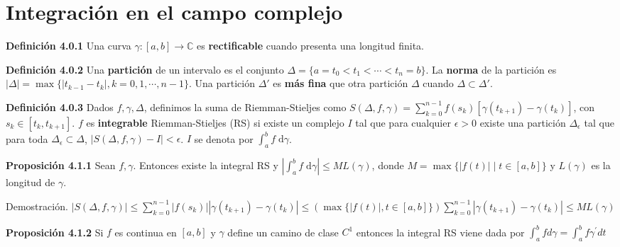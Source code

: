 \documentclass[a4paper, 11pt]{extarticle}
\newcommand{\propo}[1]{\textcolor{rojo}{\textbf{Proposición #1}}}
\newcommand{\defi}[1]{\textcolor{azul}{\textbf{Definición #1}}}
\newcommand{\dem}[1]{\textcolor{gris}{\small{Demostración. #1}}}
\begin{document}
\section*{Integración en el campo complejo}
\label{sec:org33f3f60}
\begin{multicols*}{2}


\defi{4.0.1} Una curva \(\gamma:[a,b] \rightarrow  \mathbb{C}\) es
\textbf{rectificable} cuando presenta una longitud finita.

\defi{4.0.2} Una \textbf{partición} de un intervalo es el conjunto \(\Delta = \{ a =
t_0 < t_1 < \cdots < t_n = b \}\). La \textbf{norma} de la partición es \(|\Delta| =
\max \{ |t_{k-1} - t_k|, k = 0, 1, \cdots, n-1 \}\). Una partición \(\Delta'\) es \textbf{más fina} que otra partición \(\Delta\) cuando \(\Delta \subset \Delta'\).

\defi{4.0.3} Dados \(f, \gamma, \Delta\), definimos la suma de
Riemman-Stieljes como \(S(\Delta, f, \gamma) = \sum_{k=0}^{n-1}
f(s_k)[\gamma(t_{k+1}) - \gamma(t_{k})]\), con \(s_k \in [t_k, t_{k+1}]\).
\(f\) es \textbf{integrable} Riemman-Stieljes (RS) si existe un complejo \(I\) tal que 
para cualquier \(\epsilon > 0\)
existe una partición \(\Delta_{\epsilon}\) tal que para toda \(\Delta_{\epsilon} \subset \Delta\), \(|S(\Delta, f, \gamma) - I| < \epsilon\). \(I\) se denota por \(\int_ { a }^{ b } f \; \text{d}\gamma\).

\propo{4.1.1} Sean \(f, \gamma\). Entonces existe la integral RS y 
\(\left|\int_ { a }^{ b } f \; \text{d}\gamma  \right| \le ML(\gamma)\), 
donde \(M = \max \{ |f(t)|\;|\;t \in [a,b] \}\) y \(L(\gamma)\) es la
longitud de \(\gamma\).

\dem{ \( |S(\Delta, f, \gamma)|  \leq \sum_{k=0}^{n-1}\left|f\left(s_{k}\right)\right|\left|\gamma\left(t_{k+1}\right)-\gamma\left(t_{k}\right)\right| 
 \leq(\max \{|f(t)|, t \in[a, b]\}) \sum_{k=0}^{n-1}\left|\gamma\left(t_{k+1}\right)-\gamma\left(t_{k}\right)\right| 
 \leq M L(\gamma)\) }

\propo{4.1.2} Si \(f\) es continua en \([a, b]\) y \(\gamma\) define un
camino de clase \(C^1\) entonces la integral RS viene dada por 
\(\int_{a}^{b} f d \gamma=\int_{a}^{b} f \gamma^{\prime} d t\)





\end{multicols*}
\pagebreak
\end{document}
